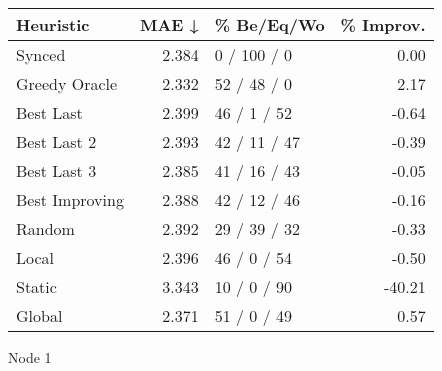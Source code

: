 \begin{tabular}{lrlr}
\toprule
\textbf{Heuristic} & \textbf{MAE ↓} & \textbf{\% Be/Eq/Wo} & \textbf{\% Improv.} \\
\midrule
            Synced &          2.384 &          0 / 100 / 0 &                0.00 \\
     Greedy Oracle &          2.332 &          52 / 48 / 0 &                2.17 \\
         Best Last &          2.399 &          46 / 1 / 52 &               -0.64 \\
       Best Last 2 &          2.393 &         42 / 11 / 47 &               -0.39 \\
       Best Last 3 &          2.385 &         41 / 16 / 43 &               -0.05 \\
    Best Improving &          2.388 &         42 / 12 / 46 &               -0.16 \\
            Random &          2.392 &         29 / 39 / 32 &               -0.33 \\
             Local &          2.396 &          46 / 0 / 54 &               -0.50 \\
            Static &          3.343 &          10 / 0 / 90 &              -40.21 \\
            Global &          2.371 &          51 / 0 / 49 &                0.57 \\
\bottomrule
\end{tabular}
\caption{Node 1}
\label{tab:hr_non_lr01_le2_bs2_1}
